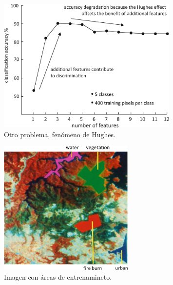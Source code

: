 \documentclass[]{beamer}
\begin{document}
\begin{frame}{\subsecname}
  \begin{figure}
  \includegraphics[width=0.8\textwidth]{imagenes/hughes.png}
  \caption{Otro problema, fenómeno de Hughes.}
  \end{figure}
\end{frame}

\begin{frame}{\subsecname}
  \begin{figure}
  \includegraphics[width=0.6\textwidth]{imagenes/t_area.png}
  \caption{Imagen con áreas de entrenamineto.}
  \end{figure}
\end{frame}
\end{document}
